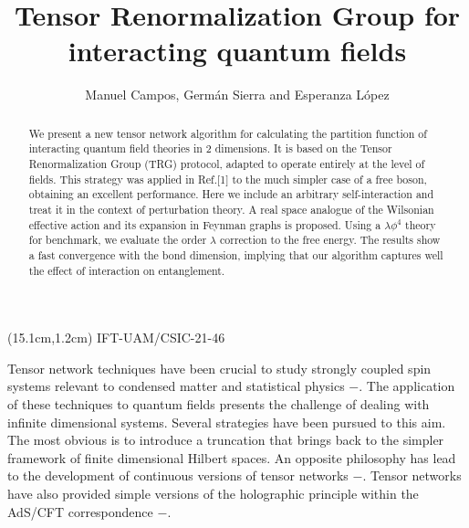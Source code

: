 \documentclass[a4paper,preprintnumbers,nofootinbib,twocolumn]{quantumarticle}
\begin{document}
\title{Tensor Renormalization Group for interacting quantum fields}

\author{Manuel Campos, Germ\'an Sierra and Esperanza L\'opez}

\begin{abstract}
We present a new tensor network algorithm for calculating the partition function of interacting quantum field theories in 2 dimensions. It is based on the Tensor Renormalization Group (TRG) protocol, adapted to operate entirely at the level of fields. This strategy was applied in Ref.[1] to the much simpler case of a free boson, obtaining an excellent performance. Here we include an arbitrary self-interaction and treat it in the context of perturbation theory. A real space analogue of the Wilsonian effective action and its expansion in Feynman graphs is proposed. Using a $\lambda \phi^4$ theory for benchmark, we evaluate the order $\lambda$ correction to the free energy. The results show a fast convergence with the bond dimension, implying that our algorithm captures well the effect of interaction on entanglement.

\end{abstract}

\begin{textblock*}{5cm}(15.1cm,1.2cm) %
   IFT-UAM/CSIC-21-46
\end{textblock*}
\maketitle


Tensor network techniques have been crucial to study strongly coupled spin systems relevant to condensed matter
and statistical physics \cite{A88}$-$\cite{V21}. The application of these techniques to quantum fields presents the challenge of dealing with
infinite dimensional systems. Several strategies have been pursued to this aim. The most obvious is to introduce a truncation
that brings back to the simpler framework of finite dimensional Hilbert spaces. An opposite philosophy
has lead to the development of continuous versions of tensor networks 
\cite{V10}$-$\cite{T21b}.
Tensor networks have also provided simple versions of the holographic principle within the AdS/CFT
correspondence \cite{Sw12}$-$\cite{J21}. 
\end{document}
